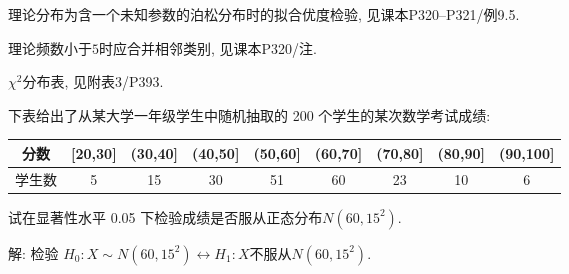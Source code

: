 \documentclass[standard]{ExBook}
\renewenvironment{shaded}{%
  \def\FrameCommand{\fboxsep=\FrameSep \colorbox{shadecolor}}%
  \MakeFramed{\advance\hsize-\width \FrameRestore}%
}{%
  \endMakeFramed
}
\begin{document}
\begin{qitems}
\textcolor{themeColor}{\selectfont {} 理论分布为含一个未知参数的泊松分布时的拟合优度检验, 见课本P320--P321/例9.5.}

\textcolor{themeColor}{\selectfont {} 理论频数小于$5$时应合并相邻类别, 见课本P320/注.}

\textcolor{themeColor}{\selectfont {} $\chi^2$分布表, 见附表3/P393.}

\vspace{2.5cm-5em}

    \begin{bbox}
    \begin{shaded}
        \qitem
下表给出了从某大学一年级学生中随机抽取的 200 个学生的某次数学考试成绩:
\begin{center}
\setlength{\tabcolsep}{8pt}
\begin{tabular}{c|cccccccc}
\hline
分数 & [20,30] & (30,40] & (40,50] & (50,60] & (60,70] & (70,80] & (80,90] & (90,100] \\
\hline
学生数 & 5 & 15 & 30 & 51 & 60 & 23 & 10 & 6 \\
\hline
\end{tabular}
\end{center}
试在显著性水平 0.05 下检验成绩是否服从正态分布$N(60,15^2)$.
    \end{shaded}
    \end{bbox}

\vspace{\dimexpr2.5cm-5em\relax}

解: 检验
$
H_0:X\sim N(60,15^2)
\leftrightarrow
H_1:X\text{不服从}N(60,15^2).
$


\end{qitems}
\end{document}
